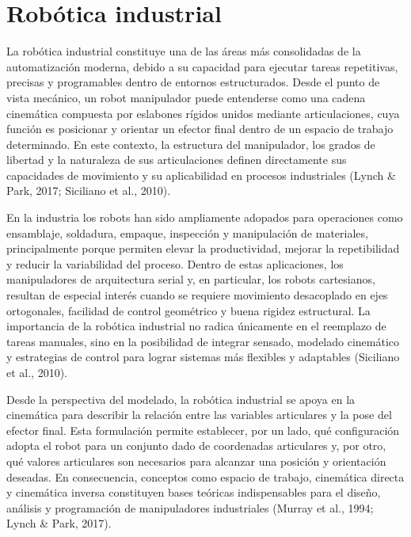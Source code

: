 
\section{Robótica industrial}
La robótica industrial constituye una de las áreas más consolidadas de la automatización moderna, debido a su capacidad para ejecutar tareas repetitivas, precisas y programables dentro de entornos estructurados. Desde el punto de vista mecánico, un robot manipulador puede entenderse como una cadena cinemática compuesta por eslabones rígidos unidos mediante articulaciones, cuya función es posicionar y orientar un efector final dentro de un espacio de trabajo determinado. En este contexto, la estructura del manipulador, los grados de libertad y la naturaleza de sus articulaciones definen directamente sus capacidades de movimiento y su aplicabilidad en procesos industriales (Lynch \& Park, 2017; Siciliano et al., 2010).

En la industria los robots han sido ampliamente adopados para operaciones como ensamblaje, soldadura, empaque, inspección y manipulación de materiales, principalmente porque permiten elevar la productividad, mejorar la repetibilidad y reducir la variabilidad del proceso. Dentro de estas aplicaciones, los manipuladores de arquitectura serial y, en particular, los robots cartesianos, resultan de especial interés cuando se requiere movimiento desacoplado en ejes ortogonales, facilidad de control geométrico y buena rigidez estructural. La importancia de la robótica industrial no radica únicamente en el reemplazo de tareas manuales, sino en la posibilidad de integrar sensado, modelado cinemático y estrategias de control para lograr sistemas más flexibles y adaptables (Siciliano et al., 2010).

Desde la perspectiva del modelado, la robótica industrial se apoya en la cinemática para describir la relación entre las variables articulares y la pose del efector final. Esta formulación permite establecer, por un lado, qué configuración adopta el robot para un conjunto dado de coordenadas articulares y, por otro, qué valores articulares son necesarios para alcanzar una posición y orientación deseadas. En consecuencia, conceptos como espacio de trabajo, cinemática directa y cinemática inversa constituyen bases teóricas indispensables para el diseño, análisis y programación de manipuladores industriales (Murray et al., 1994; Lynch \& Park, 2017).

